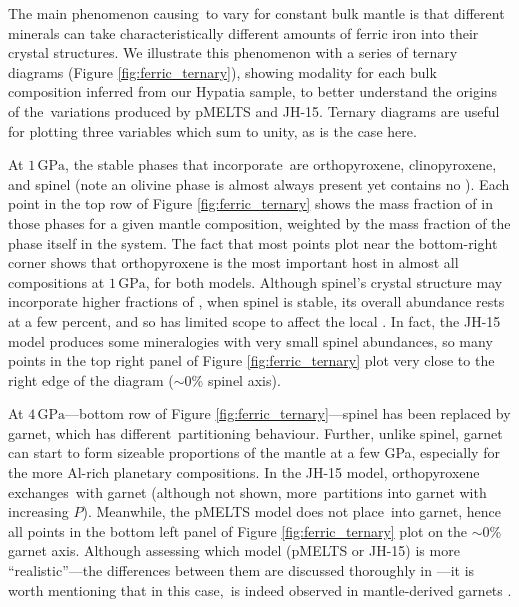 
The main phenomenon causing \fo\,to vary for constant bulk mantle \xfer\;is that different minerals can take characteristically different amounts of ferric iron into their crystal structures. We illustrate this phenomenon with a series of ternary diagrams (Figure \ref{fig:ferric_ternary}), showing  modality for each bulk composition inferred from our Hypatia sample, to better understand the origins of the \fo\,variations produced by pMELTS and JH-15. Ternary diagrams are useful for plotting three variables which sum to unity, as is the case here. 

At $1\,\text{GPa}$, the stable phases that incorporate \ferric\,are orthopyroxene, clinopyroxene, and spinel (note an olivine phase is almost always present yet contains no \ferric). Each point in the top row of Figure \ref{fig:ferric_ternary} shows the mass fraction of  in those phases for a given mantle composition, weighted by the mass fraction of the phase itself in the system. The fact that most points plot near the bottom-right corner shows that orthopyroxene is the most important \ferric\;host in almost all compositions at $1\,\text{GPa}$, for both models. Although spinel's crystal structure may incorporate higher fractions of , when spinel is stable, its overall abundance rests at a few percent, and so has limited scope to affect the local \fo. In fact, the JH-15 model produces some mineralogies with very small spinel abundances, so many points in the top right panel of Figure \ref{fig:ferric_ternary} plot very close to the right edge of the diagram ($\sim$0\% spinel axis).

At $4\,\text{GPa}$---bottom row of Figure \ref{fig:ferric_ternary}---spinel has been replaced by garnet, which has different \ferric\,partitioning behaviour. Further, unlike spinel, garnet can start to form sizeable proportions of the mantle at a few GPa, especially for the more Al-rich planetary compositions. In the JH-15 model, orthopyroxene exchanges \ferric\,with garnet (although not shown, more \ferric\,partitions into garnet with increasing $P$). Meanwhile, the pMELTS model does not place \ferric\,into garnet, hence all points in the bottom left panel of Figure \ref{fig:ferric_ternary} plot on the $\sim$0\% garnet axis. Although assessing which model (pMELTS or JH-15) is more ``realistic''---the differences between them are discussed thoroughly in \citet{stolper_effects_2020}---it is worth mentioning that in this case, \ferric\,is indeed observed in mantle-derived garnets \citep[e.g.,][]{quinn_accurate_2016}.

